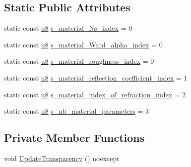 \subsection*{Static Public Attributes}
\begin{DoxyCompactItemize}
\item 
static const \hyperlink{namespacemage_a5a362e2d56fc439362a80516ecae7828}{u8} \hyperlink{structmage_1_1_material_a8f040a08a0047bb9b25786667b18e55b}{s\+\_\+material\+\_\+\+Ns\+\_\+index} = 0
\item 
static const \hyperlink{namespacemage_a5a362e2d56fc439362a80516ecae7828}{u8} \hyperlink{structmage_1_1_material_ad830f0f8fbf9f1ccd6e8304bf0bd2150}{s\+\_\+material\+\_\+\+Ward\+\_\+alpha\+\_\+index} = 0
\item 
static const \hyperlink{namespacemage_a5a362e2d56fc439362a80516ecae7828}{u8} \hyperlink{structmage_1_1_material_ad5ef721b8341cc944d1bd52ed734fc59}{s\+\_\+material\+\_\+roughness\+\_\+index} = 0
\item 
static const \hyperlink{namespacemage_a5a362e2d56fc439362a80516ecae7828}{u8} \hyperlink{structmage_1_1_material_a8d872101d667cc6fad64fde83fe8c07d}{s\+\_\+material\+\_\+reflection\+\_\+coefficient\+\_\+index} = 1
\item 
static const \hyperlink{namespacemage_a5a362e2d56fc439362a80516ecae7828}{u8} \hyperlink{structmage_1_1_material_a57b78f39bb27d8081b5db64d6026867f}{s\+\_\+material\+\_\+index\+\_\+of\+\_\+refraction\+\_\+index} = 2
\item 
static const \hyperlink{namespacemage_a5a362e2d56fc439362a80516ecae7828}{u8} \hyperlink{structmage_1_1_material_a06d6d7b7243ea8acce9445b501816d78}{s\+\_\+nb\+\_\+material\+\_\+parameters} = 3
\end{DoxyCompactItemize}
\subsection*{Private Member Functions}
\begin{DoxyCompactItemize}
\item 
void \hyperlink{structmage_1_1_material_a32525508f9083fd0336e92146083d822}{Update\+Transparency} () noexcept
\end{DoxyCompactItemize}
